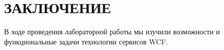 \section*{ЗАКЛЮЧЕНИЕ}

В ходе проведения лабораторной работы мы изучили возможности и
функциональные задачи технологии сервисов WCF.

\newpage

